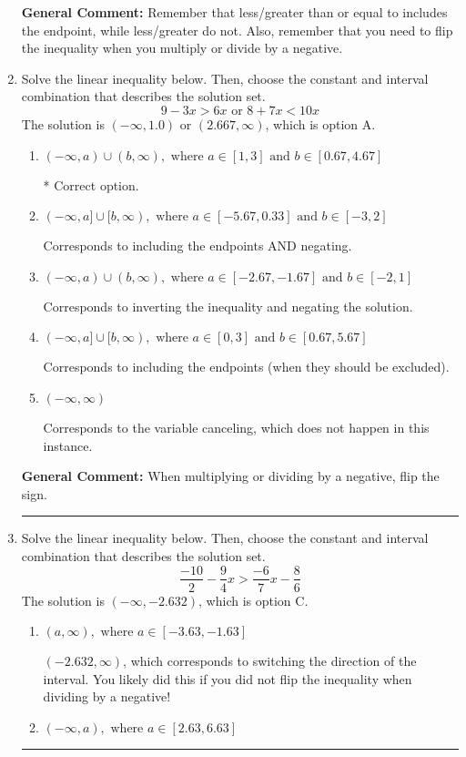 \documentclass{extbook}[14pt]
\newcommand{\litem}[1]{\item #1

\rule{\textwidth}{0.4pt}}
\begin{document}
\begin{enumerate}
{\textbf{General Comment:} Remember that less/greater than or equal to includes the endpoint, while less/greater do not. Also, remember that you need to flip the inequality when you multiply or divide by a negative.
}
\litem{
Solve the linear inequality below. Then, choose the constant and interval combination that describes the solution set.
\[ 9 - 3 x > 6 x \text{ or } 8 + 7 x < 10 x \]
The solution is \( (-\infty, 1.0) \text{ or } (2.667, \infty) \), which is option A.\begin{enumerate}[label=\Alph*.]
\item \( (-\infty, a) \cup (b, \infty), \text{ where } a \in [1, 3] \text{ and } b \in [0.67, 4.67] \)

 * Correct option.
\item \( (-\infty, a] \cup [b, \infty), \text{ where } a \in [-5.67, 0.33] \text{ and } b \in [-3, 2] \)

Corresponds to including the endpoints AND negating.
\item \( (-\infty, a) \cup (b, \infty), \text{ where } a \in [-2.67, -1.67] \text{ and } b \in [-2, 1] \)

Corresponds to inverting the inequality and negating the solution.
\item \( (-\infty, a] \cup [b, \infty), \text{ where } a \in [0, 3] \text{ and } b \in [0.67, 5.67] \)

Corresponds to including the endpoints (when they should be excluded).
\item \( (-\infty, \infty) \)

Corresponds to the variable canceling, which does not happen in this instance.
\end{enumerate}

\textbf{General Comment:} When multiplying or dividing by a negative, flip the sign.
}
\litem{
Solve the linear inequality below. Then, choose the constant and interval combination that describes the solution set.
\[ \frac{-10}{2} - \frac{9}{4} x > \frac{-6}{7} x - \frac{8}{6} \]
The solution is \( (-\infty, -2.632) \), which is option C.\begin{enumerate}[label=\Alph*.]
\item \( (a, \infty), \text{ where } a \in [-3.63, -1.63] \)

 $(-2.632, \infty)$, which corresponds to switching the direction of the interval. You likely did this if you did not flip the inequality when dividing by a negative!
\item \( (-\infty, a), \text{ where } a \in [2.63, 6.63] \)


\end{enumerate}}
\end{enumerate}
\end{document}
